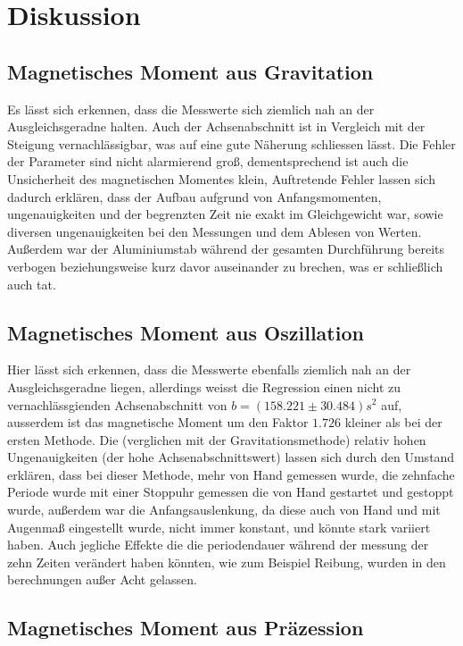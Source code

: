 \section{Diskussion}
\label{sec:Diskussion}

\subsection{Magnetisches Moment aus Gravitation}

Es lässt sich erkennen, dass die Messwerte sich ziemlich nah an der Ausgleichsgeradne halten. Auch der Achsenabschnitt ist in Vergleich mit der Steigung vernachlässigbar,
was auf eine gute Näherung schliessen lässt. Die Fehler der Parameter sind nicht alarmierend groß, dementsprechend ist auch die Unsicherheit des magnetischen Momentes klein,
Auftretende Fehler lassen sich dadurch erklären, dass der Aufbau aufgrund von Anfangsmomenten, ungenauigkeiten und der begrenzten Zeit nie exakt im Gleichgewicht war, sowie diversen ungenauigkeiten bei den Messungen und dem Ablesen von Werten.
Außerdem war der Aluminiumstab während der gesamten Durchführung bereits verbogen beziehungsweise kurz davor auseinander zu brechen, was er schließlich auch tat.

\subsection{Magnetisches Moment aus Oszillation}

Hier lässt sich erkennen, dass die Messwerte ebenfalls ziemlich nah an der Ausgleichsgeradne liegen, allerdings weisst die Regression einen nicht zu vernachlässgienden Achsenabschnitt von $b = (158.221 \pm 30.484) s^2$ auf, ausserdem ist das magnetische Moment um den Faktor $1.726$ kleiner als bei der ersten Methode.
Die (verglichen mit der Gravitationsmethode) relativ hohen Ungenauigkeiten (der hohe Achsenabschnittswert) lassen sich durch den Umstand erklären, dass bei dieser Methode, mehr von Hand gemessen wurde,
die zehnfache Periode wurde mit einer Stoppuhr gemessen die von Hand gestartet und gestoppt wurde, außerdem war die Anfangsauslenkung, da diese auch von Hand und mit Augenmaß eingestellt wurde, nicht immer konstant, und könnte stark variiert haben. Auch jegliche Effekte die die periodendauer während der messung der zehn
Zeiten verändert haben könnten, wie zum Beispiel Reibung, wurden in den berechnungen außer Acht gelassen.

\subsection{Magnetisches Moment aus Präzession}

